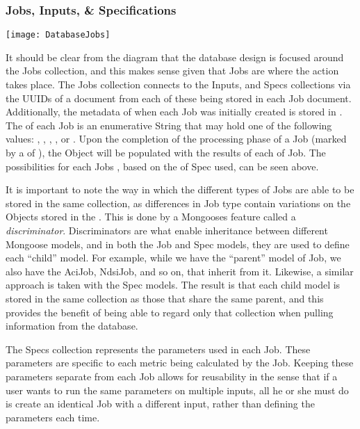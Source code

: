 \subsubsection{Jobs, Inputs, \& Specifications}
\begin{center}
  \texttt{[image: DatabaseJobs]} \\[12pt]
\end{center}
It should be clear from the diagram that the database design is focused around the Jobs collection, and this makes sense given that Jobs are where the action takes place. The Jobs collection connects to the Inputs, and Specs collections via the UUID\textquotesingle s of a document from each of these being stored in each Job document. Additionally, the metadata of when each Job was initially created is stored in . The  of each Job is an enumerative String that may hold one of the following values: , , , , or . Upon the completion of the processing phase of a Job (marked by a  of ), the  Object will be populated with the results of each  of Job. The possibilities for each Job\textquotesingle s , based on the  of Spec used, can be seen above.\par
It is important to note the way in which the different types of Jobs are able to be stored in the same collection, as differences in Job type contain variations on the Objects stored in the . This is done by a Mongoose\textquotesingle s feature called a \textit{discriminator}. Discriminators are what enable inheritance between different Mongoose models, and in both the Job and Spec models, they are used to define each ``child'' model. For example, while we have the ``parent'' model of Job, we also have the AciJob, NdsiJob, and so on, that inherit from it. Likewise, a similar approach is taken with the Spec models. The result is that each child model is stored in the same collection as those that share the same parent, and this provides the benefit of being able to regard only that collection when pulling information from the database.\par
The Specs collection represents the parameters used in each Job. These parameters are specific to each metric being calculated by the Job. Keeping these parameters separate from each Job allows for reusability in the sense that if a user wants to run the same parameters on multiple inputs, all he or she must do is create an identical Job with a different input, rather than defining the parameters each time.

